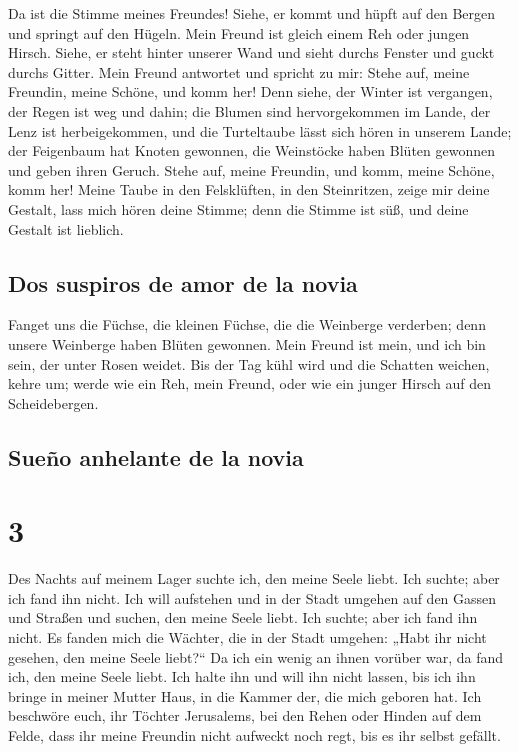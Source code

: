  Da ist die Stimme meines Freundes! Siehe, er kommt und
hüpft auf den Bergen und springt auf den Hügeln.  Mein
Freund ist gleich einem Reh oder jungen Hirsch. Siehe, er steht hinter
unserer Wand und sieht durchs Fenster und guckt durchs Gitter.
 Mein Freund antwortet und spricht zu mir: Stehe auf,
meine Freundin, meine Schöne, und komm her!  Denn siehe,
der Winter ist vergangen, der Regen ist weg und dahin; 
die Blumen sind hervorgekommen im Lande, der Lenz ist herbeigekommen,
und die Turteltaube lässt sich hören in unserem Lande; 
der Feigenbaum hat Knoten gewonnen, die Weinstöcke haben Blüten gewonnen
und geben ihren Geruch. Stehe auf, meine Freundin, und komm, meine
Schöne, komm her!  Meine Taube in den Felsklüften, in den
Steinritzen, zeige mir deine Gestalt, lass mich hören deine Stimme; denn
die Stimme ist süß, und deine Gestalt ist lieblich.

\hypertarget{dos-suspiros-de-amor-de-la-novia}{%
\subsection{Dos suspiros de amor de la
novia}\label{dos-suspiros-de-amor-de-la-novia}}

 Fanget uns die Füchse, die kleinen Füchse, die die
Weinberge verderben; denn unsere Weinberge haben Blüten gewonnen.
 Mein Freund ist mein, und ich bin sein, der unter Rosen
weidet.  Bis der Tag kühl wird und die Schatten weichen,
kehre um; werde wie ein Reh, mein Freund, oder wie ein junger Hirsch auf
den Scheidebergen.

\hypertarget{sueuxf1o-anhelante-de-la-novia}{%
\subsection{Sueño anhelante de la
novia}\label{sueuxf1o-anhelante-de-la-novia}}

\hypertarget{section-2}{%
\section{3}\label{section-2}}

 Des Nachts auf meinem Lager suchte ich, den meine Seele
liebt. Ich suchte; aber ich fand ihn nicht.  Ich will
aufstehen und in der Stadt umgehen auf den Gassen und Straßen und
suchen, den meine Seele liebt. Ich suchte; aber ich fand ihn nicht.
 Es fanden mich die Wächter, die in der Stadt umgehen:
„Habt ihr nicht gesehen, den meine Seele liebt?{}``  Da
ich ein wenig an ihnen vorüber war, da fand ich, den meine Seele liebt.
Ich halte ihn und will ihn nicht lassen, bis ich ihn bringe in meiner
Mutter Haus, in die Kammer der, die mich geboren hat.  Ich
beschwöre euch, ihr Töchter Jerusalems, bei den Rehen oder Hinden auf
dem Felde, dass ihr meine Freundin nicht aufweckt noch regt, bis es ihr
selbst gefällt.

